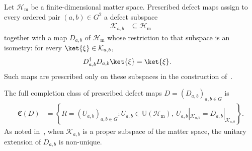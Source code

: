 \begin{definition}
    \label{def:mpug_defect_maps}
    \leanok
    Let $\mathcal H_{\mathrm m}$ be a finite-dimensional matter space.
    Prescribed defect maps assign to every ordered pair $(a,b)\in G^2$ a defect
    subspace
    \begin{align}
        \mathcal K_{a,b} & \subseteq\mathcal H_{\mathrm m}
    \end{align}
    together with a map $D_{a,b}$ of $\mathcal H_{\mathrm m}$ whose
    restriction to that subspace is an isometry: for every
    $\ket{\xi}\in\mathcal K_{a,b}$,
    \begin{align}
        D_{a,b}^\dagger D_{a,b}\ket{\xi}
         & =\ket{\xi}.
        \label{eq:mpug_defect_isometry}
    \end{align}
    Such maps are prescribed only on these subspaces in the construction
    of~\cite[lines~4215--4326]{FrancoRubio2025MPUGauging}.
\end{definition}

\begin{definition}
    \label{def:mpug_completion_class}
    \leanok
    The full completion class of prescribed defect maps
    $D=(D_{a,b})_{a,b\in G}$ is
    \begin{align}
        \mathfrak C(D)
         & =\left\{R=(U_{a,b})_{a,b\in G}:
        U_{a,b}\in\mathrm U(\mathcal H_{\mathrm m}),\
        U_{a,b}|_{\mathcal K_{a,b}}=D_{a,b}|_{\mathcal K_{a,b}}\right\}.
        \label{eq:mpug_completion_class}
    \end{align}
    As noted in~\cite[lines~4215--4326]{FrancoRubio2025MPUGauging}, when
    $\mathcal K_{a,b}$ is a proper subspace of the matter space, the unitary
    extension of $D_{a,b}$ is non-unique.
\end{definition}

